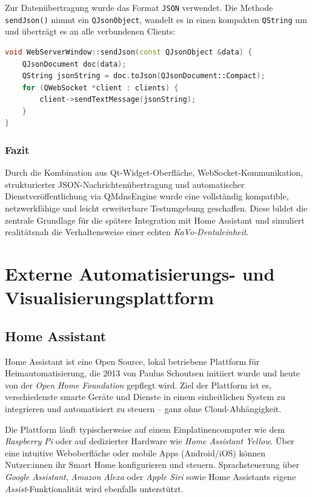 Zur Datenübertragung wurde das Format \texttt{JSON} verwendet. Die Methode \texttt{sendJson()} nimmt ein \texttt{QJsonObject}, wandelt es in einen kompakten \texttt{QString} um und überträgt es an alle verbundenen Clients:

\begin{lstlisting}[language=c++,caption={Versand strukturierter JSON-Nachrichten},label={lst:send-json}]
void WebServerWindow::sendJson(const QJsonObject &data) {
    QJsonDocument doc(data);
    QString jsonString = doc.toJson(QJsonDocument::Compact);
    for (QWebSocket *client : clients) {
        client->sendTextMessage(jsonString);
    }
}
\end{lstlisting}

\vspace{1em}
\subsubsection{Fazit}

Durch die Kombination aus Qt-Widget-Oberfläche, WebSocket-Kommunikation, strukturierter JSON-Nachrichtenübertragung und automatischer Dienstveröffentlichung via QMdnsEngine wurde eine vollständig kompatible, netzwerkfähige und leicht erweiterbare Testumgebung geschaffen. Diese bildet die zentrale Grundlage für die spätere Integration mit Home Assistant und simuliert realitätsnah die Verhaltensweise einer echten \textit{KaVo-Dentaleinheit}.

\section{Externe Automatisierungs- und Visualisierungsplattform}
\subsection{Home Assistant}

Home Assistant ist eine Open Source, lokal betriebene Plattform für Heimautomatisierung, die 2013 von Paulus Schoutsen initiiert wurde und heute von der \textit{Open Home Foundation} gepflegt wird. Ziel der Plattform ist es, verschiedenste smarte Geräte und Dienste in einem einheitlichen System zu integrieren und automatisiert zu steuern – ganz ohne Cloud-Abhängigkeit.

Die Plattform läuft typischerweise auf einem Einplatinencomputer wie dem \textit{Raspberry Pi} oder auf dedizierter Hardware wie \textit{Home Assistant Yellow}. Über eine intuitive Weboberfläche oder mobile Apps (Android/iOS) können Nutzer:innen ihr Smart Home konfigurieren und steuern. Sprachsteuerung über \textit{Google Assistant}, \textit{Amazon Alexa} oder \textit{Apple Siri} sowie Home Assistants eigene \textit{Assist}-Funktionalität wird ebenfalls unterstützt.

